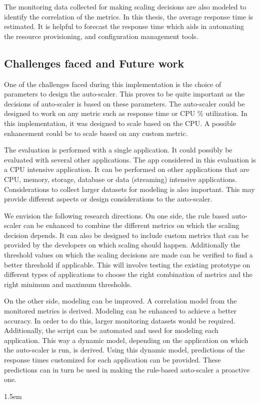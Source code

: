 \documentclass[article,type=msc,colorback,12pt,accentcolor=tud8b,table]{tudthesis}
\begin{document}
The monitoring data collected for making scaling decisions are also modeled to identify the correlation of the metrics. In this thesis, the average response time is estimated. It is helpful to forecast the response time which aids in automating the resource provisioning, and configuration management tools. 

 \subsection{Challenges faced and Future work}	
 
 One of the challenges faced during this implementation is the choice of parameters to design the auto-scaler. This proves to be quite important as the decisions of auto-scaler is based on these parameters. The auto-scaler could be designed to work on any metric such as response time or CPU \% utilization. In this implementation, it was designed to scale based on the CPU. A possible enhancement could be to scale based on any custom metric. 
 
 The evaluation is performed with a single application. It could possibly be evaluated with several other applications. The app considered in this evaluation is a CPU intensive application. It can be performed on other applications that are CPU, memory, storage, database or data (streaming) intensive applications. Considerations to collect larger datasets for modeling is also important. This may provide different aspects or design considerations to the auto-scaler.

We envision the following research directions. On one side, the rule based auto-scaler can be enhanced to combine the different metrics on which the scaling decision depends. It can also be designed to include custom metrics that can be provided by the developers on which scaling should happen. Additionally the threshold values on which the scaling decisions are made can be verified to find a better threshold if applicable. This will involve testing the existing prototype on different types of applications to choose the right combination of metrics and the right minimum and maximum thresholds. 

On the other side, modeling can be improved. A correlation model from the monitored metrics is derived. Modeling can be enhanced to achieve a better accuracy. In order to do this, larger monitoring datasets would be required. Additionally, the script can be automated and used for modeling each application. This way a dynamic model, depending on the application on which the auto-scaler is run, is derived. Using this dynamic model, predictions of the response times customized for each application can be provided. These predictions can in turn be used in making the rule-based auto-scaler a proactive one. 

\clearpage
 \hfill  

\emergencystretch 1.5em

	  

\clearpage

\printglossary
\clearpage
\end{document}
